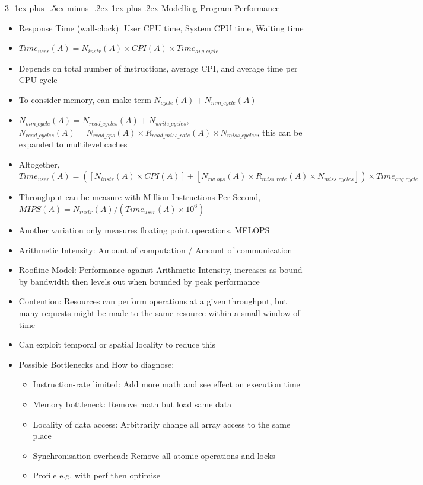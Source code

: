 \documentclass[10pt, landscape]{article}
\makeatletter
\renewcommand{\subsection}{\@startsection{subsection}{3}{0mm}%
                                {-1ex plus -.5ex minus -.2ex}%
                                {1ex plus .2ex}%
                                {\normalfont\small\bfseries}}%
\makeatother
\begin{document}
\begin{multicols*}{3}
\subsection{Modelling Program Performance}
\begin{itemize}
    \item Response Time (wall-clock): User CPU time, System CPU time, Waiting time
    \item $Time_{user}(A)=N_{instr}(A)\times CPI(A)\times Time_{avg\_cycle}$
    \item Depends on total number of instructions, average CPI, and average time per CPU cycle
    \item To consider memory, can make term $N_{cycle}(A)+N_{mm\_cycle}(A)$
    \item $N_{mm\_cycle}(A)=N_{read\_cycles}(A)+N_{write\_cycles}$, $N_{read\_cycles}(A)=N_{read\_ops}(A) \times R_{read\_miss\_rate}(A) \times N_{miss\_cycles}$, this can be expanded to multilevel caches
    \item Altogether, $Time_{user}(A)=([N_{instr}(A)\times CPI(A)]+[N_{rw\_ops}(A)\times R_{miss\_rate}(A)\times N_{miss\_cycles}]) \times Time_{avg\_cycle}$
    \item Throughput can be measure with Million Instructions Per Second, $MIPS(A)=N_{instr}(A)/(Time_{user}(A)\times 10^6)$
    \item Another variation only measures floating point operations, MFLOPS
    \item Arithmetic Intensity: Amount of computation / Amount of communication
    \item Roofline Model: Performance against Arithmetic Intensity, increases as bound by bandwidth then levels out when bounded by peak performance
    \item Contention: Resources can perform operations at a given throughput, but many requests might be made to the same resource within a small window of time
    \item Can exploit temporal or spatial locality to reduce this
    \item Possible Bottlenecks and How to diagnose:
    \begin{itemize}
        \item Instruction-rate limited: Add more math and see effect on execution time
        \item Memory bottleneck: Remove math but load same data
        \item Locality of data access: Arbitrarily change all array access to the same place
        \item Synchronisation overhead: Remove all atomic operations and locks
        \item Profile e.g. with perf then optimise
    \end{itemize}
\end{itemize}


\end{multicols*}
\end{document}
